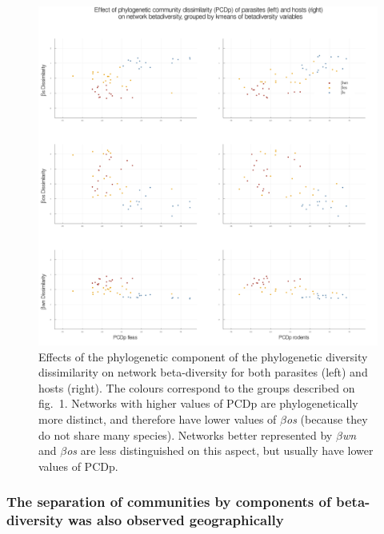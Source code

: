\documentclass[12pt]{article}
\makeatletter
\def\maxwidth{\ifdim\Gin@nat@width>\linewidth\linewidth
\else\Gin@nat@width\fi}
\let\Oldincludegraphics\includegraphics
\renewcommand{\includegraphics}[1]{\Oldincludegraphics[width=\maxwidth]{#1}}
\makeatother
\begin{document}
\begin{figure}
\hypertarget{fig:twoB}{%
\centering
\includegraphics{figures/fig2B.png}
\caption{Effects of the phylogenetic component of the phylogenetic
diversity dissimilarity on network beta-diversity for both parasites
(left) and hosts (right). The colours correspond to the groups described
on fig.~1. Networks with higher values of PCDp are phylogenetically more
distinct, and therefore have lower values of \emph{\(\beta\)os} (because
they do not share many species). Networks better represented by
\emph{\(\beta\)wn} and \emph{\(\beta\)os} are less distinguished on this
aspect, but usually have lower values of PCDp.}\label{fig:twoB}
}
\end{figure}

\hypertarget{the-separation-of-communities-by-components-of-beta-diversity-was-also-observed-geographically}{%
\subsubsection{The separation of communities by components of
beta-diversity was also observed
geographically}\label{the-separation-of-communities-by-components-of-beta-diversity-was-also-observed-geographically}}
\end{document}
